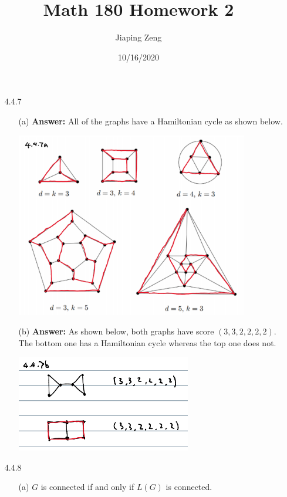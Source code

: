 \documentclass{article}
\title{Math 180 Homework 2}
\date{10/16/2020}
\author{Jiaping Zeng}
\begin{document}
\maketitle

\begin{itemize}
    \item [4.4.7]
          \begin{itemize}
              \item [(a)] \textbf{Answer:} All of the graphs have a Hamiltonian cycle as shown below.
                    \begin{center}
                        \includegraphics[width=4in]{4-4-7a.png}
                    \end{center}
              \item [(b)] \textbf{Answer:} As shown below, both graphs have score $(3,3,2,2,2,2)$. The bottom one has a Hamiltonian cycle whereas the top one does not.
                    \begin{center}
                        \includegraphics[width=3in]{4-4-7b.png}
                    \end{center}
          \end{itemize}
    \item [4.4.8]
          \begin{itemize}
              \item [(a)] $G$ is connected if and only if $L(G)$ is connected.\\

\end{itemize}
\end{itemize}
\end{document}
